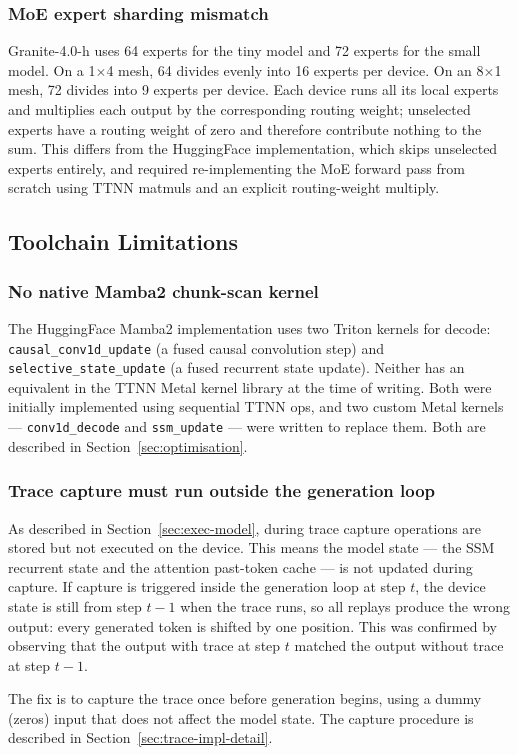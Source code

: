 \subsubsection{MoE expert sharding mismatch}

Granite-4.0-h uses 64 experts for the tiny model and 72 experts for the small model. On a 1$\times$4 mesh, 64 divides evenly into 16 experts per device. On an 8$\times$1 mesh, 72 divides into 9 experts per device. Each device runs all its local experts and multiplies each output by the corresponding routing weight; unselected experts have a routing weight of zero and therefore contribute nothing to the sum. This differs from the HuggingFace implementation, which skips unselected experts entirely, and required re-implementing the MoE forward pass from scratch using TTNN matmuls and an explicit routing-weight multiply.

\subsection{Toolchain Limitations}

\subsubsection{No native Mamba2 chunk-scan kernel}

The HuggingFace Mamba2 implementation uses two Triton kernels for decode: \texttt{causal\_\allowbreak conv1d\_\allowbreak update} (a fused causal convolution step) and \texttt{selective\_\allowbreak state\_\allowbreak update} (a fused recurrent state update). Neither has an equivalent in the TTNN Metal kernel library at the time of writing. Both were initially implemented using sequential TTNN ops, and two custom Metal kernels — \texttt{conv1d\_decode} and \texttt{ssm\_update} — were written to replace them. Both are described in Section~\ref{sec:optimisation}.

\subsubsection{Trace capture must run outside the generation loop}

As described in Section~\ref{sec:exec-model}, during trace capture operations are stored but not executed on the device. This means the model state --- the SSM recurrent state and the attention past-token cache --- is not updated during capture. If capture is triggered inside the generation loop at step $t$, the device state is still from step $t-1$ when the trace runs, so all replays produce the wrong output: every generated token is shifted by one position. This was confirmed by observing that the output with trace at step $t$ matched the output without trace at step $t-1$.

The fix is to capture the trace once before generation begins, using a dummy (zeros) input that does not affect the model state. The capture procedure is described in Section~\ref{sec:trace-impl-detail}.

